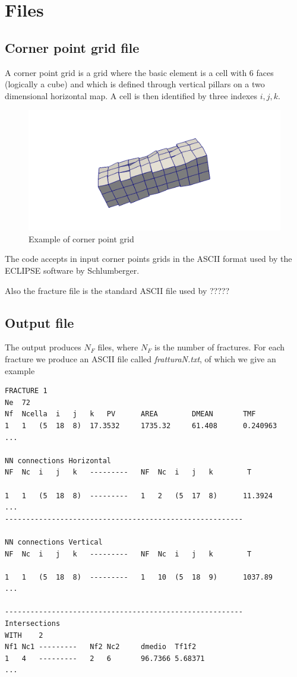 \documentclass[12pt,twoside]{article}
\begin{document}
\section{Files}
\subsection{Corner point grid file}
A corner point grid is a grid where the basic element is a cell with 6 faces (logically a cube) and  which is defined through vertical pillars 
on a two dimensional horizontal map. A cell is then identified by three indexes $i,j,k$.

\begin{figure}
	\includegraphics[scale=0.3]{./img/CPgrid.png}
	\caption{Example of corner point grid}
\end{figure}

The code accepts in input corner points grids in the ASCII format used by the
ECLIPSE software by Schlumberger. 

Also the fracture file is the standard ASCII file used by ????? 

\subsection{Output file}
The output produces $N_F$ files, where $N_F$ 
is the number of fractures. For each fracture we produce an ASCII file called
 \emph{fratturaN.txt}, of which we give an example
\begin{verbatim}
FRACTURE 1
Ne  72
Nf	Ncella	i	j	k	PV		AREA		DMEAN		TMF
1	1	(5	18	8)	17.3532		1735.32		61.408		0.240963
...

NN connections Horizontal
NF	Nc	i	j	k	---------	NF	Nc	i	j	k		 T

1	1	(5	18	8)	---------	1	2	(5	17	8)		11.3924
...
--------------------------------------------------------

NN connections Vertical
NF	Nc	i	j	k	---------	NF	Nc	i	j	k		 T

1	1	(5	18	8)	---------	1	10	(5	18	9)		1037.89
...

--------------------------------------------------------
Intersections 
WITH	2
Nf1	Nc1	---------	Nf2	Nc2		dmedio	Tf1f2
1	4	---------	2	6		96.7366	5.68371
...
\end{verbatim}
\end{document}
